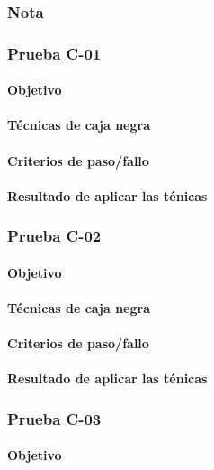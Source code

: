 \documentclass[10pt,a4paper]{article}
\begin{document}
			\subsubsection{Nota}

			\subsubsection{Prueba C-01}
			\paragraph{Objetivo}
			\paragraph{Técnicas de caja negra}
			\paragraph{Criterios de paso/fallo}
			\paragraph{Resultado de aplicar las ténicas}
			\subsubsection{Prueba C-02}
			\paragraph{Objetivo}
			\paragraph{Técnicas de caja negra}
			\paragraph{Criterios de paso/fallo}
			\paragraph{Resultado de aplicar las ténicas}
			\subsubsection{Prueba C-03}
			\paragraph{Objetivo}
\end{document}
